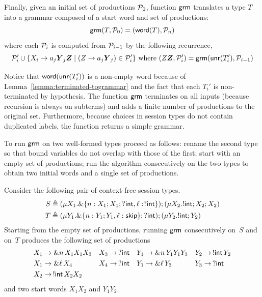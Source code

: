 
Finally, given an initial set of productions $\mathcal P_0$, function
$\mathsf{grm}$ translates a type $T$ into a grammar composed of a start word
and set of productions:
%
\begin{equation*}
  \mathsf{grm}(T,\mathcal P_0) = (\mathsf{word}(T), \mathcal P_n)
\end{equation*}
%
where each $\mathcal P_i$ is computed from $\mathcal P_{i-1}$ by
the following recurrence,
\begin{equation*}
                       \productions_i' \cup \{X_i \rightarrow a_j\vec
                       Y_j \vec Z \mid (Z \rightarrow a_j \vec Y_j)\in
                       \productions_i'\} \text{ where }(Z \vec Z, \productions_i')=\grm(\Unravel(T_i'), \productions_{i-1})
\end{equation*}

Notice that $\mathsf{word}(\mathsf{unr}(T_i'))$ is a non-empty word because of
Lemma~\ref{lemma:terminated-togrammar} and the fact that each $T_i'$
is non-terminated by hypothesis.  The function $\mathsf{grm}$ terminates on
all inputs (because recursion is always on subterms) and adds a finite
number of productions to the original set. Furthermore, because
choices in session types do not contain duplicated labels, the
function returns a simple grammar.

To run $\mathsf{grm}$ on two well-formed types proceed as follows: rename the
second type so that bound variables do not overlap with those of the
first; start with an empty set of productions; run the algorithm
consecutively on the two types to obtain two initial words and a
single set of productions.

\begin{example}
  \label{ex:productions}
  Consider the following pair of context-free session types.
  \begin{align*}
    S & \triangleq (\mu X_1. \&\{n: X_1;X_1;?\mathsf{int}, \ell: ?\mathsf{int}\});(\mu X_2. !\mathsf{int} ; X_2;X_2)\\
    T & \triangleq (\mu Y_1. \&\{n: Y_1;Y_1, \ell: \mathsf{skip}\};?\mathsf{int});(\mu Y_2. !\mathsf{int} ; Y_2)
  \end{align*}
  Starting from the empty set of productions, running $\mathsf{grm}$
  consecutively on~$S$ and on~$T$ produces the following set of
  productions
  \begin{align*}
    X_1 &\rightarrow \& n\, X_1 X_1 X_3 & X_3 &\rightarrow \,? \mathsf{int} &
    Y_1 &\rightarrow \& n\, Y_1 Y_1 Y_3 & Y_2 &\rightarrow \,!\mathsf{int}\, Y_2 
    \\
    X_1 &\rightarrow \& \ell\, X_4           & X_4 &\rightarrow \,? \mathsf{int} &
    Y_1 &\rightarrow \& \ell \,Y_3           & Y_3 &\rightarrow \,? \mathsf{int}
    \\
    X_2 &\rightarrow \,!\mathsf{int}\, X_2 X_2
  \end{align*}
  and two start words $X_1X_2$ and $Y_1Y_2$.
\end{example}

